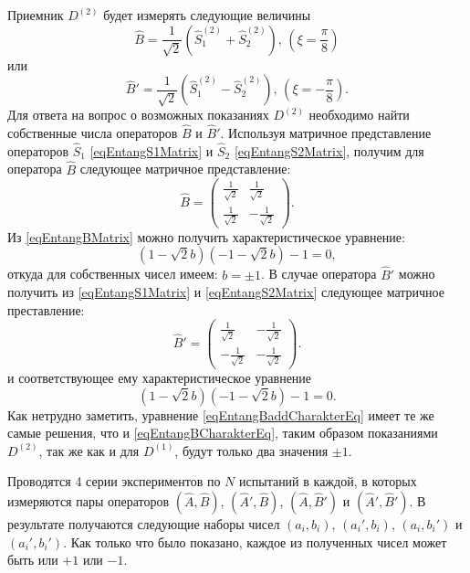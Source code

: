 Приемник $D^{(2)}$ будет измерять следующие величины 
\[
\hat{B} = \frac{1}{\sqrt{2}}\left(\hat{S}_1^{(2)} + \hat{S}_2^{(2)}\right),\,(\xi =
\frac{\pi}{8}) 
\]
или 
\[
\hat{B}' = \frac{1}{\sqrt{2}}\left(\hat{S}_1^{(2)} - \hat{S}_2^{(2)}\right),\,(\xi =
- \frac{\pi}{8}).
\]
Для ответа на вопрос о возможных показаниях $D^{(2)}$ необходимо найти
собственные числа операторов $\hat{B}$ и $\hat{B}'$. Используя
матричное представление операторов $\hat{S}_1$
\eqref{eqEntangS1Matrix} и $\hat{S}_2$ \eqref{eqEntangS2Matrix},
получим для оператора $\hat{B}$ следующее матричное представление:
\begin{equation}
\hat{B} = 
\left(
\begin{array}{cc}
\frac{1}{\sqrt{2}} & \frac{1}{\sqrt{2}} \\
\frac{1}{\sqrt{2}} & -\frac{1}{\sqrt{2}} 
\end{array}
\right).
\label{eqEntangBMatrix}
\end{equation}
Из \eqref{eqEntangBMatrix} можно получить характеристическое
уравнение:
\begin{equation}
\left(1 -\sqrt{2} b\right)\left(- 1 -\sqrt{2} b\right) -1 = 0,
\label{eqEntangBCharakterEq}
\end{equation}
откуда для собственных чисел имеем: $b = \pm 1$. В случае оператора
$\hat{B}'$  можно получить из \eqref{eqEntangS1Matrix} и
\eqref{eqEntangS2Matrix} следующее матричное преставление:
\begin{equation}
\hat{B}' = 
\left(
\begin{array}{cc}
\frac{1}{\sqrt{2}} & -\frac{1}{\sqrt{2}} \\
-\frac{1}{\sqrt{2}} & -\frac{1}{\sqrt{2}} 
\end{array}
\right).
\label{eqEntangBaddMatrix}
\end{equation}
и соответствующее ему характеристическое уравнение
\begin{equation}
\left(1 -\sqrt{2} b\right)\left(- 1 -\sqrt{2} b\right) -1 = 0.
\label{eqEntangBaddCharakterEq}
\end{equation}
Как нетрудно заметить, уравнение \eqref{eqEntangBaddCharakterEq} имеет
те же самые решения, что и \eqref{eqEntangBCharakterEq}, таким образом
показаниями $D^{(2)}$, так же как и для $D^{(1)}$, будут только два
значения $\pm 1$.

Проводятся 4 серии экспериментов по $N$ испытаний в каждой, в которых
измеряются пары операторов $\left(\hat{A},\hat{B}\right)$,
$\left(\hat{A}',\hat{B}\right)$, $\left(\hat{A},\hat{B}'\right)$ и
$\left(\hat{A}',\hat{B}'\right)$. В результате получаются следующие
наборы чисел $\left(a_i, b_i\right)$, $\left(a_i', b_i\right)$, $\left(a_i, b_i'\right)$ и
$\left(a_i', b_i'\right)$.
Как только что было показано, каждое
из полученных чисел может быть или $+1$ или $-1$.

